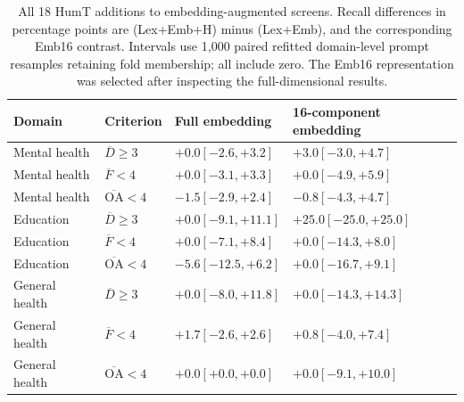 \begin{table}[p]
\centering\footnotesize
\caption{All 18 HumT additions to embedding-augmented screens. Recall differences in percentage points are (Lex+Emb+H) minus (Lex+Emb), and the corresponding Emb16 contrast. Intervals use 1,000 paired refitted domain-level prompt resamples retaining fold membership; all include zero. The Emb16 representation was selected after inspecting the full-dimensional results.}
\label{tab:semantic_increments}
\begin{tabular}{llll}
\toprule
Domain & Criterion & Full embedding & 16-component embedding \\
\midrule
Mental health & $\overline D\geq3$ & $+0.0 [-2.6, +3.2]$ & $+3.0 [-3.0, +4.7]$ \\
Mental health & $\overline F<4$ & $+0.0 [-3.1, +3.3]$ & $+0.0 [-4.9, +5.9]$ \\
Mental health & $\overline{\mathrm{OA}}<4$ & $-1.5 [-2.9, +2.4]$ & $-0.8 [-4.3, +4.7]$ \\
Education & $\overline D\geq3$ & $+0.0 [-9.1, +11.1]$ & $+25.0 [-25.0, +25.0]$ \\
Education & $\overline F<4$ & $+0.0 [-7.1, +8.4]$ & $+0.0 [-14.3, +8.0]$ \\
Education & $\overline{\mathrm{OA}}<4$ & $-5.6 [-12.5, +6.2]$ & $+0.0 [-16.7, +9.1]$ \\
General health & $\overline D\geq3$ & $+0.0 [-8.0, +11.8]$ & $+0.0 [-14.3, +14.3]$ \\
General health & $\overline F<4$ & $+1.7 [-2.6, +2.6]$ & $+0.8 [-4.0, +7.4]$ \\
General health & $\overline{\mathrm{OA}}<4$ & $+0.0 [+0.0, +0.0]$ & $+0.0 [-9.1, +10.0]$ \\
\bottomrule
\end{tabular}
\end{table}
